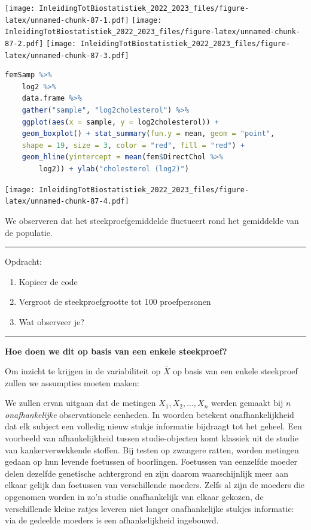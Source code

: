 \documentclass[
  12pt,dutch,coursenotes]{book}
\providecommand{\tightlist}{%
  \setlength{\itemsep}{0pt}\setlength{\parskip}{0pt}}
\begin{document}
\texttt{[image: InleidingTotBiostatistiek\_2022\_2023\_files/figure-latex/unnamed-chunk-87-1.pdf]} \texttt{[image: InleidingTotBiostatistiek\_2022\_2023\_files/figure-latex/unnamed-chunk-87-2.pdf]} \texttt{[image: InleidingTotBiostatistiek\_2022\_2023\_files/figure-latex/unnamed-chunk-87-3.pdf]}

\begin{lstlisting}[language=R]
femSamp %>%
    log2 %>%
    data.frame %>%
    gather("sample", "log2cholesterol") %>%
    ggplot(aes(x = sample, y = log2cholesterol)) +
    geom_boxplot() + stat_summary(fun.y = mean, geom = "point",
    shape = 19, size = 3, color = "red", fill = "red") +
    geom_hline(yintercept = mean(fem$DirectChol %>%
        log2)) + ylab("cholesterol (log2)")
\end{lstlisting}

\texttt{[image: InleidingTotBiostatistiek\_2022\_2023\_files/figure-latex/unnamed-chunk-87-4.pdf]}

We observeren dat het steekproefgemiddelde fluctueert rond het gemiddelde van de populatie.

\begin{center}\rule{0.5\linewidth}{0.5pt}\end{center}

Opdracht:

\begin{enumerate}
\def\labelenumi{\arabic{enumi}.}
\tightlist
\item
  Kopieer de code
\item
  Vergroot de steekproefgrootte tot 100 proefpersonen
\item
  Wat observeer je?
\end{enumerate}

\begin{center}\rule{0.5\linewidth}{0.5pt}\end{center}

\textbf{Hoe doen we dit op basis van een enkele steekproef?}

Om inzicht te krijgen in de variabiliteit op \(\bar X\) op basis van een enkele steekproef zullen we assumpties moeten maken:

We zullen ervan uitgaan dat de metingen \(X_1, X_2, ..., X_n\) werden gemaakt bij \(n\) \emph{onafhankelijke}
observationele eenheden. In woorden betekent onafhankelijkheid dat elk subject een volledig
nieuw stukje informatie bijdraagt tot het geheel. Een voorbeeld van
afhankelijkheid tussen studie-objecten komt klassiek uit de studie van
kankerverwekkende stoffen. Bij testen op zwangere ratten, worden metingen
gedaan op hun levende foetussen of boorlingen. Foetussen van eenzelfde
moeder delen dezelfde genetische achtergrond en zijn daarom waarschijnlijk
meer aan elkaar gelijk dan foetussen van verschillende moeders. Zelfs al
zijn de moeders die opgenomen worden in zo'n studie onafhankelijk van elkaar
gekozen, de verschillende kleine ratjes leveren niet langer onafhankelijke
stukjes informatie: via de gedeelde moeders is een afhankelijkheid
ingebouwd.
\end{document}
